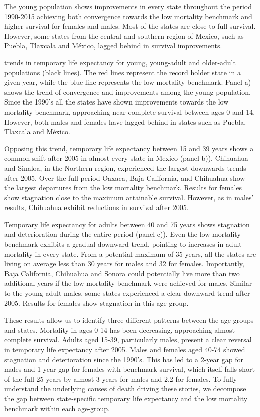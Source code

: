 \documentclass{bmcart}
\begin{document}
The young population shows improvements in every state throughout the period 1990-2015 achieving both convergence towards the low mortality benchmark and higher survival for females and males. Most of the states are close to full survival. However, some states from the central and southern region of Mexico, such as Puebla, Tlaxcala and M\'exico, lagged behind in survival improvements.  

trends in temporary life expectancy for young, young-adult and older-adult populations (black lines). The red lines represent the record holder state in a given year, while the blue line represents the low mortality benchmark. Panel a) shows the trend of convergence and improvements among the young population. Since the 1990's all the states have shown improvements towards the low mortality benchmark, approaching near-complete survival between ages 0 and 14. However, both males and females have lagged behind in states such as Puebla, Tlaxcala and M\'exico.

Opposing this trend, temporary life expectancy between 15 and 39 years shows a common shift after 2005 in almost every state in Mexico  (panel b)). Chihuahua and Sinaloa, in the Northern region, experienced the largest downwards trends after 2005. Over the full period Oaxaca, Baja California, and Chihuahua  show the largest departures from the low mortality benchmark. Results for females show stagnation close to the maximum attainable survival. However,  as in males' results, Chihuahua exhibit reductions in survival after 2005.

Temporary life expectancy for adults between 40 and 75 years shows stagnation and deterioration during the entire period (panel c)). Even the low mortality benchmark exhibits a gradual downward trend, pointing to increases in adult mortality in every state. From a potential maximum of 35 years, 
all the states are living on average less than 30 years for males and 32 for females. Importantly,  Baja California, Chihuahua and Sonora could potentially live more than two additional years if the low mortality benchmark were achieved for males. Similar to the young-adult males, some states experienced a  clear downward trend after 2005. Results for females show stagnation in this age-group. 

These results allow us to identify three different patterns between the age groups and states. Mortality in ages 0-14 has been decreasing, approaching almost complete survival. Adults aged 15-39, particularly males, present a clear reversal in temporary life expectancy after 2005. Males and females aged 40-74 showed stagnation and deterioration since the 1990's. This has led to a 2-year gap for males and 1-year gap for females with benchmark survival, which itself falls short of the full 25 years by almost 3 years for males and 2.2 for females. To fully understand the underlying causes of death driving these stories, we decompose the gap between state-specific temporary life expectancy and the low mortality benchmark within each age-group.\\
\end{document}
